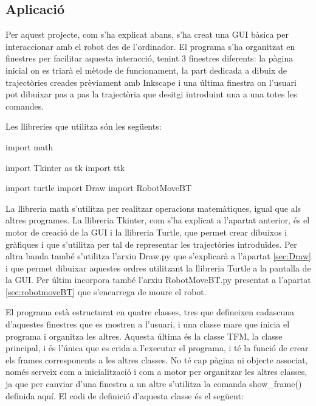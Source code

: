 \subsection{Aplicació}
Per aquest projecte, com s’ha explicat abans, s’ha creat una GUI bàsica per interaccionar amb el robot des de l’ordinador. El programa s’ha organitzat en finestres per facilitar aquesta interacció, tenint 3 finestres diferents: la pàgina inicial on es triarà el mètode de funcionament, la part dedicada a dibuix de trajectòries creades prèviament amb Inkscape i una última finestra on l’usuari pot dibuixar pas a pas la trajectòria que desitgi introduint una a una totes les comandes.

Les llibreries que utilitza són les següents:

\begin{python}
	import math
	
	import Tkinter as tk
	import ttk
	
	import turtle
	import Draw
	import RobotMoveBT
\end{python}

La llibreria math s'utilitza per realitzar operacions matemàtiques, igual que als altres programes. La llibreria Tkinter, com s’ha explicat a l’apartat anterior, és el motor de creació de la GUI i la llibreria Turtle, que permet crear dibuixos i gràfiques i que s’utilitza per tal de representar les trajectòries introduïdes. Per altra banda també s’utilitza l’arxiu Draw.py que s’explicarà a l’apartat \ref{sec:Draw} i que permet dibuixar aquestes ordres utilitzant la llibreria Turtle a la pantalla de la GUI.  Per últim incorpora també l’arxiu RobotMoveBT.py presentat a l’apartat \ref{sec:robotmoveBT} que s’encarrega de moure el robot. 

El programa està estructurat en quatre classes, tres que defineixen cadascuna d’aquestes finestres que es mostren a l’usuari, i una classe mare que inicia el programa i organitza les altres. Aquesta última és la classe TFM, la classe principal, i és l’única que es crida a l'executar el programa, i té la funció de crear els frames corresponents a les altres classes. No té cap pàgina ni objecte associat, només serveix com a inicialització i com a motor per organitzar les altres classes, ja que per canviar d’una finestra a un altre s’utilitza la comanda show\_frame() definida aquí. El codi de definició d’aquesta classe és el següent:

